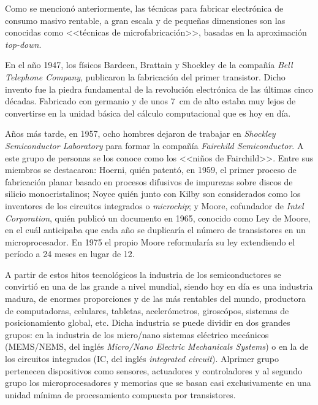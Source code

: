 		Como se mencionó anteriormente, las técnicas para fabricar electrónica de consumo masivo rentable, a gran escala y de pequeñas dimensiones son las conocidas como <<técnicas de microfabricación>>, basadas en la aproximación \textit{top-down}. \cite{Jaeger2001}

		En el año 1947, los físicos Bardeen, Brattain y Shockley de la compañía \textit{Bell Telephone Company}, publicaron la fabricación del primer transistor. Dicho invento fue la piedra fundamental de la revolución electrónica de las últimas cinco décadas. Fabricado con germanio y de unos \SI{7}{cm} de alto estaba muy lejos de convertirse en la unidad básica del cálculo computacional que es hoy en día. \cite{riordan1999} 

		Años más tarde, en 1957, ocho hombres dejaron de trabajar en \textit{Shockley Semiconductor Laboratory} para formar la compañía \textit{Fairchild Semiconductor}. A este grupo de personas se los conoce como los <<niños de Fairchild>>. Entre sus miembros se destacaron: Hoerni, quién patentó, en 1959, el primer proceso de fabricación planar basado en   procesos difusivos de impurezas sobre discos de silicio monocristalinos; Noyce quién junto con Kilby son considerados como los inventores de los circuitos integrados o \textit{microchip}; y Moore, cofundador de \textit{Intel Corporation}, quién publicó un documento en 1965, conocido como Ley de Moore, en el cuál anticipaba que cada año se duplicaría el número de transistores en un microprocesador. En 1975 el propio Moore reformularía su ley extendiendo el período a 24 meses en lugar de 12. \cite{moore2006,riordan1999,fagen1984}

		A partir de estos hitos tecnológicos la industria de los semiconductores se convirtió en una de las grande a nivel mundial, siendo hoy en día es una industria madura, de enormes proporciones y de las más rentables del mundo, productora de computadoras, celulares, tabletas, acelerómetros, giroscópos, sistemas de posicionamiento global, etc. Dicha industria se puede dividir en dos grandes grupos: en la industria de los micro/nano sistemas eléctrico mecánicos (MEMS/NEMS, del inglés \textit{Micro/Nano Electric Mechanicals Systems}) o en la de los circuitos integrados (IC, del inglés \textit{integrated circuit}). Al\space primer grupo pertenecen dispositivos como sensores, actuadores y controladores y al segundo grupo los microprocesadores y memorias que se basan casi exclusivamente en una unidad mínima de procesamiento compuesta por transistores.\cite{Franssila2004,Jaeger2001,Madou2002}

